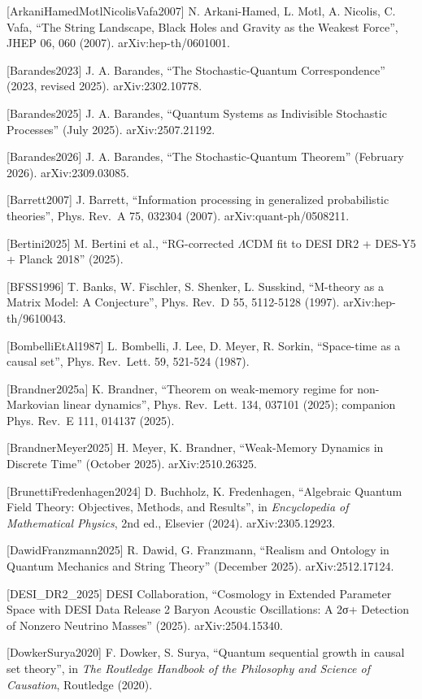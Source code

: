 \documentclass[
]{article}
\begin{document}
{[}ArkaniHamedMotlNicolisVafa2007{]} N. Arkani-Hamed, L. Motl, A.
Nicolis, C. Vafa, ``The String Landscape, Black Holes and Gravity as the
Weakest Force'', JHEP 06, 060 (2007). arXiv:hep-th/0601001.

{[}Barandes2023{]} J. A. Barandes, ``The Stochastic-Quantum
Correspondence'' (2023, revised 2025). arXiv:2302.10778.

{[}Barandes2025{]} J. A. Barandes, ``Quantum Systems as Indivisible
Stochastic Processes'' (July 2025). arXiv:2507.21192.

{[}Barandes2026{]} J. A. Barandes, ``The Stochastic-Quantum Theorem''
(February 2026). arXiv:2309.03085.

{[}Barrett2007{]} J. Barrett, ``Information processing in generalized
probabilistic theories'', Phys. Rev.~A 75, 032304 (2007).
arXiv:quant-ph/0508211.

{[}Bertini2025{]} M. Bertini et al., ``RG-corrected \(\Lambda\)CDM fit
to DESI DR2 + DES-Y5 + Planck 2018'' (2025).

{[}BFSS1996{]} T. Banks, W. Fischler, S. Shenker, L. Susskind,
``M-theory as a Matrix Model: A Conjecture'', Phys. Rev.~D 55, 5112-5128
(1997). arXiv:hep-th/9610043.

{[}BombelliEtAl1987{]} L. Bombelli, J. Lee, D. Meyer, R. Sorkin,
``Space-time as a causal set'', Phys. Rev.~Lett. 59, 521-524 (1987).

{[}Brandner2025a{]} K. Brandner, ``Theorem on weak-memory regime for
non-Markovian linear dynamics'', Phys. Rev.~Lett. 134, 037101 (2025);
companion Phys. Rev.~E 111, 014137 (2025).

{[}BrandnerMeyer2025{]} H. Meyer, K. Brandner, ``Weak-Memory Dynamics in
Discrete Time'' (October 2025). arXiv:2510.26325.

{[}BrunettiFredenhagen2024{]} D. Buchholz, K. Fredenhagen, ``Algebraic
Quantum Field Theory: Objectives, Methods, and Results'', in
\emph{Encyclopedia of Mathematical Physics}, 2nd ed., Elsevier (2024).
arXiv:2305.12923.

{[}DawidFranzmann2025{]} R. Dawid, G. Franzmann, ``Realism and Ontology
in Quantum Mechanics and String Theory'' (December 2025).
arXiv:2512.17124.

{[}DESI\_DR2\_2025{]} DESI Collaboration, ``Cosmology in Extended
Parameter Space with DESI Data Release 2 Baryon Acoustic Oscillations: A
2σ+ Detection of Nonzero Neutrino Masses'' (2025). arXiv:2504.15340.

{[}DowkerSurya2020{]} F. Dowker, S. Surya, ``Quantum sequential growth
in causal set theory'', in \emph{The Routledge Handbook of the
Philosophy and Science of Causation}, Routledge (2020).
\end{document}
